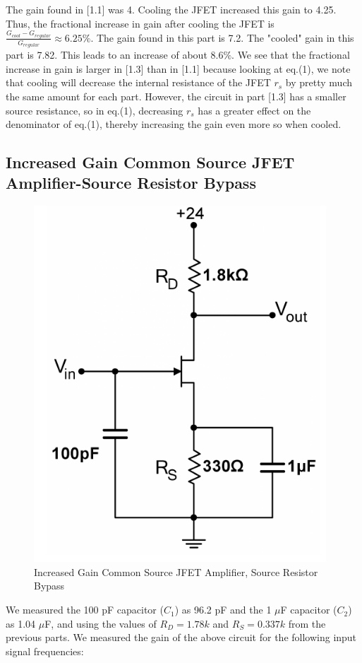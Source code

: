 \documentclass{article}
\begin{document}
    The gain found in [1.1] was 4. Cooling the JFET increased this gain to 4.25. Thus, the fractional increase in gain after cooling the JFET is $\frac{G_{cool} - G_{regular}}{G_{regular}} \approx 6.25\%$. The gain found in this part is 7.2. The "cooled" gain in this part is 7.82. This leads to an increase of about $8.6\%$. We see that the fractional increase in gain is larger in [1.3] than in [1.1] because looking at eq.(1), we note that cooling will decrease the internal resistance of the JFET $r_s$ by pretty much the same amount for each part. However, the circuit in part [1.3] has a smaller source resistance, so in eq.(1), decreasing $r_s$ has a greater effect on the denominator of eq.(1), thereby increasing the gain even more so when cooled. 
    
\subsection{Increased Gain Common Source JFET Amplifier-Source Resistor Bypass}
    \begin{figure}[H]
        \centering
        \includegraphics[scale = 0.6]{5_4.png}
        \caption{Increased Gain Common Source JFET Amplifier, Source Resistor Bypass~\cite{webfig}}
        \label{fig:my_label}
    \end{figure}
    We measured the 100 pF capacitor ($C_1$) as 96.2 pF and the 1 $\mu$F capacitor ($C_2$) as 1.04 $\mu$F, and using the values of $R_D = 1.78k$ and $R_S = 0.337k$ from the previous parts. We measured the gain of the above circuit for the following input signal frequencies:
\end{document}
